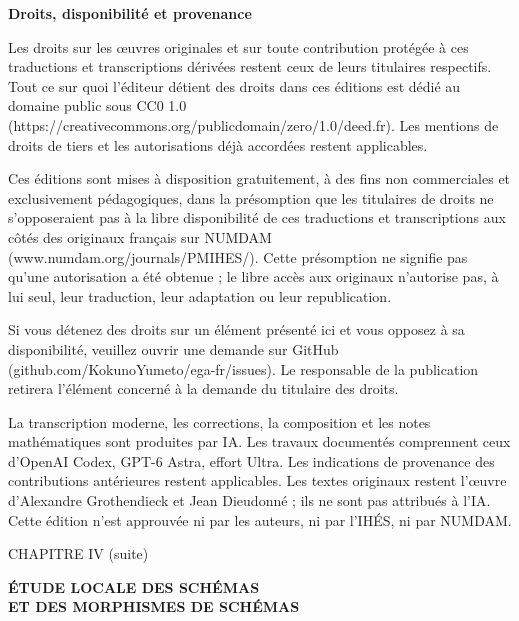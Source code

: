 \documentclass[10pt,oneside]{book}
\newcommand{\oldpage}[2][]{%
  \setcounter{footnote}{0}%
  \marginpar{\scriptsize\textbf{#1}~|~#2}\ignorespaces}
\begin{document}
\clearpage
\begingroup
\small
\noindent\textbf{Droits, disponibilité et provenance}

Les droits sur les œuvres originales et sur toute contribution protégée à ces traductions et transcriptions dérivées restent ceux de leurs titulaires respectifs. Tout ce sur quoi l'éditeur détient des droits dans ces éditions est dédié au domaine public sous CC0 1.0 (https://creativecommons.org/publicdomain/zero/1.0/deed.fr). Les mentions de droits de tiers et les autorisations déjà accordées restent applicables.

Ces éditions sont mises à disposition gratuitement, à des fins non commerciales et exclusivement pédagogiques, dans la présomption que les titulaires de droits ne s'opposeraient pas à la libre disponibilité de ces traductions et transcriptions aux côtés des originaux français sur NUMDAM (www.numdam.org/journals/PMIHES/). Cette présomption ne signifie pas qu'une autorisation a été obtenue ; le libre accès aux originaux n'autorise pas, à lui seul, leur traduction, leur adaptation ou leur republication.

Si vous détenez des droits sur un élément présenté ici et vous opposez à sa disponibilité, veuillez ouvrir une demande sur GitHub (github.com/KokunoYumeto/ega-fr/issues). Le responsable de la publication retirera l'élément concerné à la demande du titulaire des droits.

La transcription moderne, les corrections, la composition et les notes mathématiques sont produites par IA. Les travaux documentés comprennent ceux d'OpenAI Codex, GPT-6 Astra, effort Ultra. Les indications de provenance des contributions antérieures restent applicables. Les textes originaux restent l'œuvre d'Alexandre Grothendieck et Jean Dieudonné ; ils ne sont pas attribués à l'IA. Cette édition n'est approuvée ni par les auteurs, ni par l'IHÉS, ni par NUMDAM.
\par
\endgroup
\clearpage

%
\clearpage
\thispagestyle{plain}
\oldpage[IV-2]{5}
\label{chapter:IV2-fr}

\begin{center}
{\large CHAPITRE IV (suite)\par}
\vspace{1.5em}
{\Large\bfseries ÉTUDE LOCALE DES SCHÉMAS\\
ET DES MORPHISMES DE SCHÉMAS\par}
\end{center}
\end{document}
